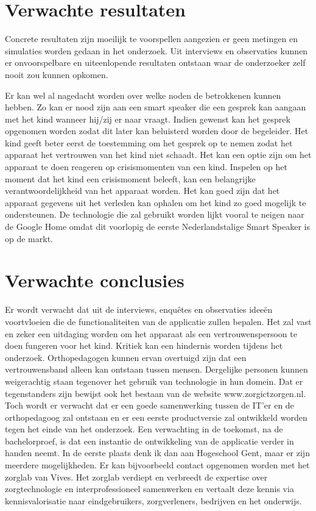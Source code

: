 \section{Verwachte resultaten}
\label{sec:verwachte_resultaten}

Concrete resultaten zijn moeilijk te voorspellen aangezien er geen metingen en simulaties worden gedaan in het onderzoek. Uit interviews en observaties kunnen er onvoorspelbare en uiteenlopende resultaten ontstaan waar de onderzoeker zelf nooit zou kunnen opkomen.

Er kan wel al nagedacht worden over welke noden de betrokkenen kunnen hebben. Zo kan er nood zijn aan een smart speaker die een gesprek kan aangaan met het kind wanneer hij/zij er naar vraagt. Indien gewenst kan het gesprek opgenomen worden zodat dit later kan beluisterd worden door de begeleider. Het kind geeft beter eerst de toestemming om het gesprek op te nemen zodat het apparaat het vertrouwen van het kind niet schaadt.
Het kan een optie zijn om het apparaat te doen reageren op crisismomenten van een kind. Inspelen op het moment dat het kind een crisismoment beleeft, kan een belangrijke verantwoordelijkheid van het apparaat worden.
Het kan goed zijn dat het apparaat gegevens uit het verleden kan ophalen om het kind zo goed mogelijk te ondersteunen.
De technologie die zal gebruikt worden lijkt vooral te neigen naar de Google Home omdat dit voorlopig de eerste Nederlandstalige Smart Speaker is op de markt.

\section{Verwachte conclusies}
\label{sec:verwachte_conclusies}

Er wordt verwacht dat uit de interviews, enquêtes en observaties ideeën voortvloeien die de functionaliteiten van de applicatie zullen bepalen. Het zal vast en zeker een uitdaging worden om het apparaat als een vertrouwenspersoon te doen fungeren voor het kind.
Kritiek kan een hindernis worden tijdens het onderzoek.
Orthopedagogen kunnen ervan overtuigd zijn dat een vertrouwensband alleen kan ontstaan tussen mensen. Dergelijke personen kunnen weigerachtig staan tegenover het gebruik van technologie in hun domein.
Dat er tegenstanders zijn bewijst ook het bestaan van de website www.zorgictzorgen.nl.
Toch wordt er verwacht dat er een goede samenwerking tussen de IT'er en de orthopedagoog zal ontstaan en er een eerste productversie zal ontwikkeld worden tegen het einde van het onderzoek.
Een verwachting in de toekomst, na de bachelorproef, is dat een instantie de ontwikkeling van de applicatie verder in handen neemt. In de eerste plaats denk ik dan aan Hogeschool Gent, maar er zijn meerdere mogelijkheden. Er kan bijvoorbeeld contact opgenomen worden met het zorglab van Vives. Het zorglab verdiept en verbreedt de expertise over zorgtechnologie en interprofessioneel samenwerken en vertaalt deze kennis via kennisvalorisatie naar eindgebruikers, zorgverleners, bedrijven en het onderwijs.~\autocite{Vives}


